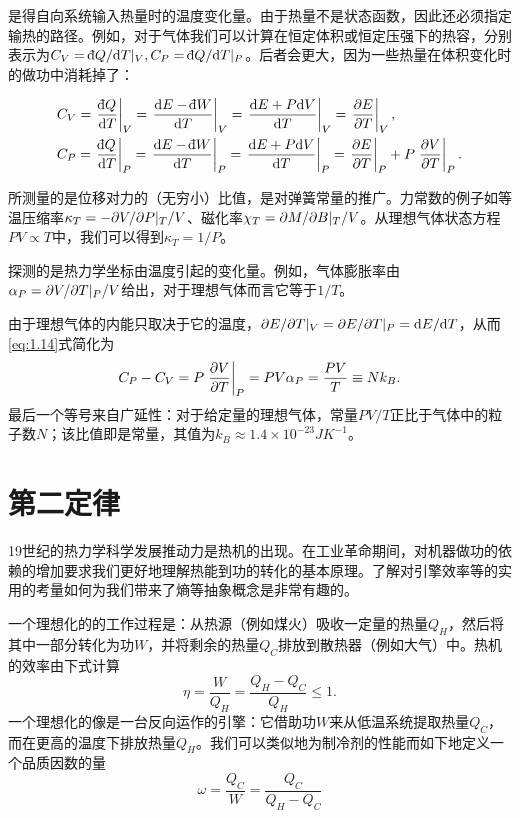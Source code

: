 	是得自向系统输入热量时的温度变化量。由于热量不是状态函数，因此还必须指定输热的路径。例如，对于气体我们可以计算在恒定体积或恒定压强下的热容，分别表示为\(C_V=\ddbar Q/\dd T|_V, C_P=\ddbar Q/\dd T|_P\)。后者会更大，因为一些热量在体积变化时的做功中消耗掉了：

	\begin{equation}\label{eq:1.14}
		\begin{aligned}
			&C_V=\left.\frac{\ddbar Q}{\dd T}\right|_V=\left.\frac{\dd E-\ddbar W}{\dd T}\right|_V=\left.\frac{\dd E+P\dd V}{\dd T}\right|_V=\left.\frac{\pd E}{\pd T}\right|_V,\\
			&C_P=\left.\frac{\ddbar Q}{\dd T}\right|_P=\left.\frac{\dd E-\ddbar W}{\dd T}\right|_P=\left.\frac{\dd E+P\dd V}{\dd T}\right|_P=\left.\frac{\pd E}{\pd T}\right|_P+P\left.\frac{\pd V}{\pd T}\right|_P.
		\end{aligned}
	\end{equation}
	
	所测量的是位移对力的（无穷小）比值，是对弹簧常量的推广。力常数的例子如等温压缩率\(\kappa_T=-\partial V/\partial P|_T/V\)、磁化率\(\chi_T=\partial M/\partial B|_T/V\)。从理想气体状态方程\(PV\propto T\)中，我们可以得到\(\kappa_T=1/P\)。

	探测的是热力学坐标由温度引起的变化量。例如，气体膨胀率由\(\alpha_P=\partial V/\partial T|_P/V\)给出，对于理想气体而言它等于\(1/T\)。

	由于理想气体的内能只取决于它的温度，\(\partial E/\partial T|_{V}=\partial E/\partial T|_{P}={\mathrm d} E/{\mathrm d} T\)，从而\ref{eq:1.14}式简化为
	\begin{equation}
		C_P-C_V=P\left.\frac{\partial V}{\partial T}\right|_{P}=PV\alpha_P=\frac{PV}{T}\equiv Nk_B.
	\end{equation}
	最后一个等号来自广延性：对于给定量的理想气体，常量\(PV/T\)正比于气体中的粒子数$N$；该比值即是{\boltzmann}常量，其值为\(k_B\approx1.4\times10^{−23}JK^{−1}\)。

\section{第二定律}

	19世纪的热力学科学发展推动力是热机的出现。在工业革命期间，对机器做功的依赖的增加要求我们更好地理解热能到功的转化的基本原理。了解对引擎效率等的实用的考量如何为我们带来了熵等抽象概念是非常有趣的。

	一个理想化的的工作过程是：从热源（例如煤火）吸收一定量的热量\(Q_H\)，然后将其中一部分转化为功$W$，并将剩余的热量\(Q_C\)排放到散热器（例如大气）中。热机的效率由下式计算
	\begin{equation}
		\eta=\frac{W}{Q_H}=\frac{Q_H-Q_C}{Q_H}\leq1.
	\end{equation}
	一个理想化的像是一台反向运作的引擎：它借助功$W$来从低温系统提取热量$Q_C$，而在更高的温度下排放热量$Q_H$。我们可以类似地为制冷剂的性能而如下地定义一个品质因数的量
	\begin{equation}
		\omega=\frac{Q_C}{W}=\frac{Q_C}{Q_H-Q_C}
	\end{equation}

